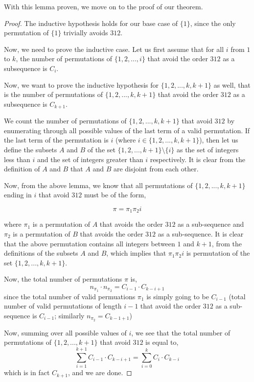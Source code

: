 \documentclass[11pt,letterpaper,twoside,english]{article}
\theoremstyle{theorem}
\theoremstyle{remark}
\begin{document}
With this lemma proven, we move on to the proof of our theorem.

\begin{proof}
The inductive hypothesis holds for our base case of $\{1\}$, since the only permutation of $\{1\}$ trivially avoids $312$.

Now, we need to prove the inductive case. Let us first assume that for all $i$ from $1$ to $k$, the number of permutations of $\{1,2,...,i\}$ that avoid the order $312$ as a subsequence is $C_i$.

Now, we want to prove the inductive hypothesis for $\{1,2,...,k,k+1\}$ as well, that is the number of permutations of $\{1,2,...,k,k+1\}$ that avoid the order $312$ as a subsequence is $C_{k+1}$.

We count the number of permutations of $\{1,2,...,k,k+1\}$ that avoid $312$ by enumerating through all possible values of the last term of a valid permutation.
If the last term of the permutation is $i$ (where $i \in \{1,2,...,k,k+1\}$), then let us define the subsets $A$ and $B$ of the  set $\{1,2,...,k+1\} \setminus \{i\}$ as the set of integers less than $i$ and the set of integers greater than $i$ respectively. It is clear from the definition of $A$ and $B$ that $A$ and $B$ are disjoint from each other.

Now, from the above lemma, we know that all permutations of $\{1,2,...,k,k+1\}$ ending in $i$ that avoid $312$ must be of the form,

$$\pi = \pi_1 \pi_2 i$$

where $\pi_1$ is a permutation of $A$ that avoids the order $312$ as a sub-sequence and $\pi_2$ is a permutation of $B$ that avoids the order $312$ as a sub-sequence. It is clear that the above permutation contains all integers between $1$ and $k+1$, from the definitions of the subsets $A$ and $B$, which implies that $\pi_1\pi_2i$ is permutation of the set $\{1,2,...,k,k+1\}$.

Now, the total number of permutations $\pi$ is,
$$n_{\pi_1} \cdot n_{\pi_2} = C_{i-1} \cdot C_{k-i+1}$$
since the total number of valid permuations $\pi_1$ is simply going to be $C_{i-1}$ (total number of valid permutations of length $i-1$ that avoid the order $312$ as a sub-sequence is $C_{i-1}$; similarly $n_{\pi_2} = C_{k-1+1}$)

Now, summing over all possible values of $i$, we see that the total number of permutations of $\{1,2,...,k+1\}$ that avoid $312$ is equal to,
$$\sum_{i=1}^{k+1} C_{i-1} \cdot C_{k-i+1} = \sum_{i=0}^k C_i \cdot C_{k-i}$$ which is in fact $C_{k+1}$, and we are done.

\end{proof}
\end{document}
